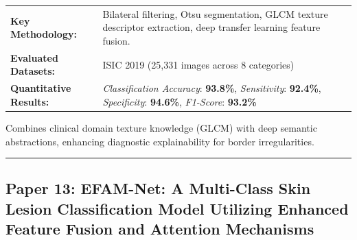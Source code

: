 \documentclass[10pt,a4paper]{article}
\begin{document}
\vspace{4pt}
\begin{tabularx}{\linewidth}{p{3.2cm}X}
\toprule
\textbf{Key Methodology:} & Bilateral filtering, Otsu segmentation, GLCM texture descriptor extraction, deep transfer learning feature fusion. \\
\textbf{Evaluated Datasets:} & ISIC 2019 (25,331 images across 8 categories) \\
\textbf{Quantitative Results:} & \textit{Classification Accuracy}: \textbf{93.8\%}, \textit{Sensitivity}: \textbf{92.4\%}, \textit{Specificity}: \textbf{94.6\%}, \textit{F1-Score}: \textbf{93.2\%} \\
\bottomrule
\end{tabularx}
\vspace{4pt}
\begin{tcolorbox}[utilitybox,title=Clinical Utility and Real-World Impact]
Combines clinical domain texture knowledge (GLCM) with deep semantic abstractions, enhancing diagnostic explainability for border irregularities.
\end{tcolorbox}
\vspace{12pt}
\hrule
\vspace{12pt}
\subsection*{Paper 13: EFAM-Net: A Multi-Class Skin Lesion Classification Model Utilizing Enhanced Feature Fusion and Attention Mechanisms}
\end{document}
